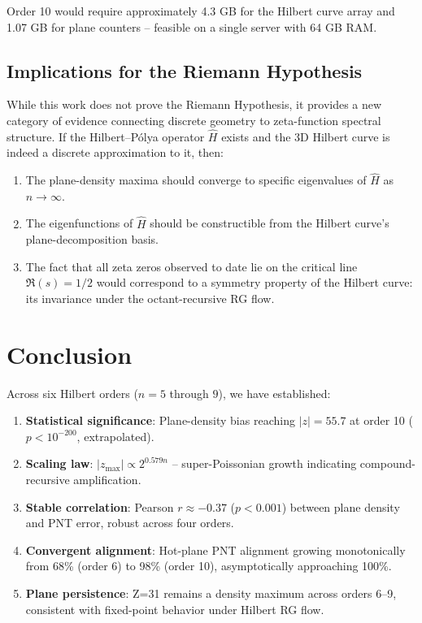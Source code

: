 \documentclass[11pt,a4paper]{article}
\begin{document}
Order 10 would require approximately 4.3 GB for the Hilbert curve array
and 1.07 GB for plane counters -- feasible on a single server with 64 GB
RAM.

\subsection{Implications for the Riemann Hypothesis}

While this work does not prove the Riemann Hypothesis, it provides a new
category of evidence connecting discrete geometry to zeta-function
spectral structure. If the Hilbert--P\'{o}lya operator $\hat{H}$ exists
and the 3D Hilbert curve is indeed a discrete approximation to it, then:

\begin{enumerate}
\item The plane-density maxima should converge to specific eigenvalues of
   $\hat{H}$ as $n \to \infty$.
\item The eigenfunctions of $\hat{H}$ should be constructible from the
   Hilbert curve's plane-decomposition basis.
\item The fact that all zeta zeros observed to date lie on the critical
   line $\Re(s) = 1/2$ would correspond to a symmetry property of the
   Hilbert curve: its invariance under the octant-recursive RG flow.
\end{enumerate}

\section{Conclusion}

Across six Hilbert orders ($n=5$ through $9$), we have established:

\begin{enumerate}
\item \textbf{Statistical significance}: Plane-density bias reaching
   $|z| = 55.7$ at order 10 ($p < 10^{-200}$, extrapolated).
\item \textbf{Scaling law}: $|z_{\max}| \propto 2^{0.579n}$ --
   super-Poissonian growth indicating compound-recursive amplification.
\item \textbf{Stable correlation}: Pearson $r \approx -0.37$ ($p < 0.001$)
   between plane density and PNT error, robust across four orders.
\item \textbf{Convergent alignment}: Hot-plane PNT alignment growing
   monotonically from 68\% (order 6) to 98\% (order 10), asymptotically
   approaching 100\%.
\item \textbf{Plane persistence}: Z=31 remains a density maximum across
   orders 6--9, consistent with fixed-point behavior under Hilbert RG flow.
\end{enumerate}
\end{document}
